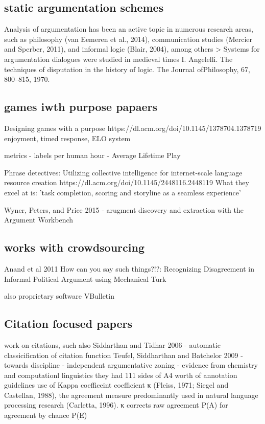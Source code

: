 \documentclass{article}
\begin{document}
\subsection{static argumentation schemes}
Analysis of argumentation has been an active topic in numerous research areas, such as philosophy (van Eemeren et al., 2014), communication studies (Mercier and Sperber, 2011), and informal logic (Blair, 2004), among others
> Systems for argumentation dialogues were studied in medieval times 
I. Angelelli. The techniques of disputation in the history of logic. The Journal ofPhilosophy, 67, 800–815, 1970.

\subsection{ games iwth purpose papaers}
Designing games with a purpose
https://dl.acm.org/doi/10.1145/1378704.1378719
enjoyment, timed response, ELO system

metrics
- labels per human hour
- Average Lifetime Play

Phrase detectives: Utilizing collective intelligence for internet-scale language resource creation
https://dl.acm.org/doi/10.1145/2448116.2448119
What they excel at is: 'task completion, scoring and storyline as a seamless experience'

Wyner, Peters, and Price 2015 - arugment discovery and extraction with the Argument Workbench

\subsection{works with crowdsourcing}
Anand et al 2011 How can you say such things?!?: Recognizing Disagreement in Informal Political Argument
using Mechanical Turk

also proprietary software VBulletin

\subsection{Citation focused papers}

work on citations, such also
Siddarthan and Tidhar 2006 - automatic classicification of citation function
Teufel, Siddharthan and Batchelor  2009 - towards discipline - independent argumentative zoning - evidence from chemistry and computationl linguistics
they had 111 sides of A4 worth of annotation guidelines
use of Kappa coefficeint
coefficient κ (Fleiss, 1971; Siegel and Castellan, 1988), the agreement measure predominantly used in natural language processing research (Carletta, 1996). κ corrects raw agreement P(A) for agreement by chance P(E)
\end{document}
